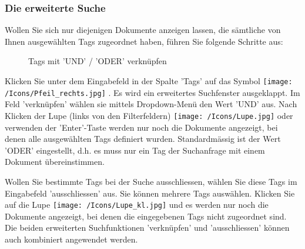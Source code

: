 \vspace{\baselineskip}

\subsubsection{Die erweiterte Suche}

Wollen Sie sich nur diejenigen Dokumente anzeigen lassen, die sämtliche von Ihnen ausgewählten Tags zugeordnet haben, führen Sie folgende Schritte aus:

\begin{figure}[H]
\caption{Tags mit 'UND' / 'ODER' verknüpfen}
\end{figure}

Klicken Sie unter dem Eingabefeld in der Spalte 'Tags' auf das Symbol \texttt{[image: /Icons/Pfeil\_rechts.jpg]} . Es wird ein erweitertes Suchfenster ausgeklappt. Im Feld 'verknüpfen'  wählen sie mittels Dropdown-Menü den Wert 'UND'  aus. Nach Klicken der Lupe (links von den Filterfeldern) \texttt{[image: /Icons/Lupe.jpg]}  oder verwenden der 'Enter'-Taste werden nur noch die Dokumente angezeigt, bei denen alle ausgewählten Tags definiert wurden. Standardmässig ist der Wert 'ODER' eingestellt, d.h. es muss nur ein Tag der Suchanfrage mit einem Dokument übereinstimmen. \newline

Wollen Sie bestimmte Tags bei der Suche ausschliessen, wählen Sie diese Tags im Eingabefeld 'ausschliessen'  aus. Sie können mehrere Tags auswählen. Klicken Sie auf die Lupe \texttt{[image: /Icons/Lupe\_kl.jpg]} und es werden nur noch die Dokumente angezeigt, bei denen die eingegebenen Tags nicht zugeordnet sind. Die beiden erweiterten Suchfunktionen 'verknüpfen' und 'ausschliessen' können auch kombiniert angewendet werden.

\vspace{\baselineskip}


